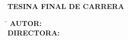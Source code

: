 \begin{titlepage}
{\begin{minipage}[t]{0.4\textwidth}
\begin{tabbing}
        \end{tabbing}
      \end{minipage}%
      \begin{minipage}[t]{0.1\textwidth}
        \vspace{1.5cm}
        \raggedleft
        {\fontsize{13}{16}\selectfont \the\year \par}
      \end{minipage}
    }{%
      {\noindent\bfseries\fontsize{12}{14}\selectfont TESINA FINAL DE CARRERA\par}
      \vspace{0.5cm}
      {\noindent\raggedright\itshape\fontsize{22}{24}\selectfont \titleesp\par}
      \vspace{2cm}

      \noindent
      
      \begin{minipage}[t]{0.4\textwidth}
        \raggedright
        \begin{tabbing}
          \hspace{4cm}\=\kill
          \textbf{\fontsize{12}{10}\selectfont AUTOR:}\> \GetFirstAuthor \\[0.3cm]
          \textbf{\fontsize{12}{10}\selectfont DIRECTORA:}\> \GetSupervisor   \\

        \end{tabbing}
      \end{minipage}%
      \begin{minipage}[t]{0.45\textwidth}
        \vspace{2cm}
        \raggedleft
        {\fontsize{13}{16}\selectfont \the\year \par}
      \end{minipage}
    }

    \vspace{1cm}
  \endgroup
\end{titlepage}
\restoregeometry
\MediaOptionLogicBlank